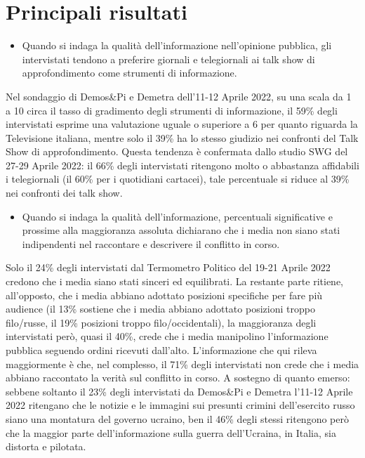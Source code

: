 \documentclass[
]{book}
\providecommand{\tightlist}{%
  \setlength{\itemsep}{0pt}\setlength{\parskip}{0pt}}
\begin{document}
\hypertarget{principali-risultati-6}{%
\section{Principali risultati}\label{principali-risultati-6}}

\begin{itemize}
\tightlist
\item
  Quando si indaga la qualità dell'informazione nell'opinione pubblica, gli intervistati tendono a preferire giornali e telegiornali ai talk show di approfondimento come strumenti di informazione.
\end{itemize}

Nel sondaggio di Demos\&Pi e Demetra dell'11-12 Aprile 2022, su una scala da 1 a 10 circa il tasso di gradimento degli strumenti di informazione, il 59\% degli intervistati esprime una valutazione uguale o superiore a 6 per quanto riguarda la Televisione italiana, mentre solo il 39\% ha lo stesso giudizio nei confronti del Talk Show di approfondimento. Questa tendenza è confermata dallo studio SWG del 27-29 Aprile 2022: il 66\% degli intervistati ritengono molto o abbastanza affidabili i telegiornali (il 60\% per i quotidiani cartacei), tale percentuale si riduce al 39\% nei confronti dei talk show.

\begin{itemize}
\tightlist
\item
  Quando si indaga la qualità dell'informazione, percentuali significative e prossime alla maggioranza assoluta dichiarano che i media non siano stati indipendenti nel raccontare e descrivere il conflitto in corso.
\end{itemize}

Solo il 24\% degli intervistati dal Termometro Politico del 19-21 Aprile 2022 credono che i media siano stati sinceri ed equilibrati. La restante parte ritiene, all'opposto, che i media abbiano adottato posizioni specifiche per fare più audience (il 13\% sostiene che i media abbiano adottato posizioni troppo filo/russe, il 19\% posizioni troppo filo/occidentali), la maggioranza degli intervistati però, quasi il 40\%, crede che i media manipolino l'informazione pubblica seguendo ordini ricevuti dall'alto. L'informazione che qui rileva maggiormente è che, nel complesso, il 71\% degli intervistati non crede che i media abbiano raccontato la verità sul conflitto in corso.
A sostegno di quanto emerso: sebbene soltanto il 23\% degli intervistati da Demos\&Pi e Demetra l'11-12 Aprile 2022 ritengano che le notizie e le immagini sui presunti crimini dell'esercito russo siano una montatura del governo ucraino, ben il 46\% degli stessi ritengono però che la maggior parte dell'informazione sulla guerra dell'Ucraina, in Italia, sia distorta e pilotata.
\end{document}
